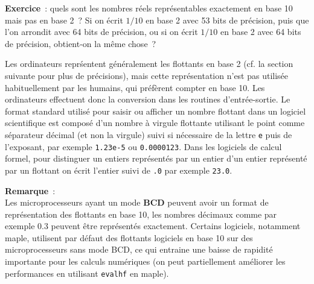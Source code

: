 \documentclass[a4paper,11pt]{book}
\begin{document}
\begin{giacjshere}
{\bf Exercice}~: quels sont les nombres r\'eels repr\'esentables exactement
en base 10 mais pas en base 2~?
Si on écrit $1/10$ en base 2 avec 53 bits de précision, puis que
l'on arrondit avec 64 bits de précision, ou si on écrit $1/10$ en
base 2 avec 64 bits de précision, obtient-on la même chose~?

Les ordinateurs repr\'sentent g\'en\'eralement les flottants en base 2 
(cf. la section suivante pour
plus de pr\'ecisions), mais cette repr\'esentation n'est pas utilis\'ee
habituellement par les humains, qui pr\'ef\`erent compter
en base 10. Les ordinateurs effectuent donc la conversion dans
les routines d'entr\'ee-sortie. Le format standard utilis\'e
pour saisir ou afficher un nombre flottant dans un logiciel
scientifique est compos\'e d'un nombre \`a virgule
flottante utilisant le point comme s\'eparateur d\'ecimal (et
non la virgule) suivi si n\'ecessaire de la lettre \verb|e| puis de l'exposant,
par exemple \verb|1.23e-5| ou \verb|0.0000123|. Dans les
logiciels de calcul formel, pour distinguer un entiers
repr\'esent\'es par un entier
d'un entier repr\'esent\'e par un flottant on \'ecrit
l'entier suivi de \verb|.0| par exemple \verb|23.0|.

{\bf Remarque}~:\\
Les microprocesseurs ayant un mode {\bf BCD} peuvent avoir un format
de repr\'esentation des flottants en base 10, les nombres d\'ecimaux
comme par exemple 0.3 peuvent \^etre repr\'esent\'es exactement. 
Certains logiciels, notamment maple, utilisent par d\'efaut des
flottants logiciels en base 10 sur des microprocesseurs sans mode BCD, 
ce qui entraine une baisse de
rapidit\'e importante pour les calculs num\'eriques (on peut
partiellement am\'eliorer les performances en utilisant \verb|evalhf|
en maple).


\end{giacjshere}
\end{document}

